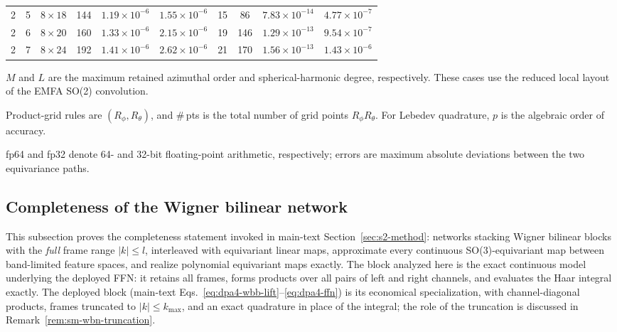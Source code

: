 \begin{table}[p]
\begin{threeparttable}
\begin{tabular*}{\linewidth}{@{\extracolsep{\fill}}cccccccccc@{}}
            2 & 5 & $8\times18$  & 144 & $1.19\times10^{-6}$ & $1.55\times10^{-6}$ & 15 & 86  & $7.83\times10^{-14}$ & $4.77\times10^{-7}$ \\
            2 & 6 & $8\times20$  & 160 & $1.33\times10^{-6}$ & $2.15\times10^{-6}$ & 19 & 146 & $1.29\times10^{-13}$ & $9.54\times10^{-7}$ \\
            2 & 7 & $8\times24$  & 192 & $1.41\times10^{-6}$ & $2.62\times10^{-6}$ & 21 & 170 & $1.56\times10^{-13}$ & $1.43\times10^{-6}$ \\
            \bottomrule
        \end{tabular*}
        \begin{tablenotes}[flushleft]
            \PaperTableNotesStyle
            \item[] $M$ and $L$ are the maximum retained azimuthal order and spherical-harmonic degree, respectively. These cases use the reduced local layout of the EMFA SO(2) convolution.
            \item[] Product-grid rules are $(R_{\phi},R_{\theta})$, and \#\,pts is the total number of grid points $R_{\phi}R_{\theta}$. For Lebedev quadrature, $p$ is the algebraic order of accuracy.
            \item[] fp64 and fp32 denote 64- and 32-bit floating-point arithmetic, respectively; errors are maximum absolute deviations between the two equivariance paths.
        \end{tablenotes}
    \end{threeparttable}
\end{table}

\subsection{Completeness of the Wigner bilinear network}
\label{sec:sm-wbn-complete}

This subsection proves the completeness statement invoked in main-text Section~\ref{sec:s2-method}: networks stacking Wigner bilinear blocks with the \emph{full} frame range $|k|\le l$, interleaved with equivariant linear maps, approximate every continuous SO(3)-equivariant map between band-limited feature spaces, and realize polynomial equivariant maps exactly.
The block analyzed here is the exact continuous model underlying the deployed FFN: it retains all frames, forms products over all pairs of left and right channels, and evaluates the Haar integral exactly.
The deployed block (main-text Eqs.~\eqref{eq:dpa4-wbb-lift}--\eqref{eq:dpa4-ffn}) is its economical specialization, with channel-diagonal products, frames truncated to $|k|\le k_{\max}$, and an exact quadrature in place of the integral; the role of the truncation is discussed in Remark~\ref{rem:sm-wbn-truncation}.


